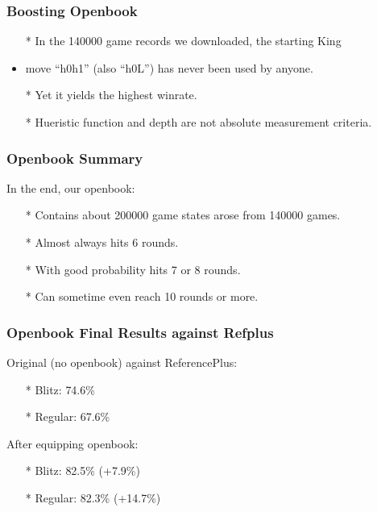 \documentclass[10pt]{beamer}
\begin{document}
	\begin{frame}
		\frametitle{Boosting Openbook}
		
		\begin{itemize}
		\item[*] In the 140000 game records we downloaded, the starting King
		\item move ``h0h1'' (also ``h0L'') has never been used by anyone.\pause
		\item[*] Yet it yields the highest winrate. \pause
		\item[*] Hueristic function and depth are not absolute measurement criteria.
		\end{itemize}
		
	\end{frame}
	
	\begin{frame}
		\frametitle{Openbook Summary}

		In the end, our openbook:
		\begin{itemize}
		\item[*] Contains about \textcolor{fgreen}{200000} game states arose from \textcolor{fgreen}{140000} games.
		\item[*] Almost always hits \textcolor{fgreen}{6} rounds.
		\item[*] With good probability hits \textcolor{fgreen}{7} or \textcolor{fgreen}{8} rounds.
		\item[*] Can sometime even reach \textcolor{fgreen}{10} rounds or more.
		\end{itemize}
	\end{frame}

	\begin{frame}
		\frametitle{Openbook Final Results against Refplus}

		Original (no openbook) against ReferencePlus:
		\begin{itemize}
		\item[*] Blitz: \textcolor{dred}{74.6\%}
		\item[*] Regular: \textcolor{dred}{67.6\%}
		\end{itemize}
		\pause
		After equipping openbook:
		\begin{itemize}
		\item[*] Blitz: \textcolor{fgreen}{82.5\%} (\textcolor{fgreen}{+7.9\%})
		\item[*] Regular: \textcolor{fgreen}{82.3\%} (\textcolor{fgreen}{+14.7\%})
		\end{itemize}
	\end{frame}
\end{document}
